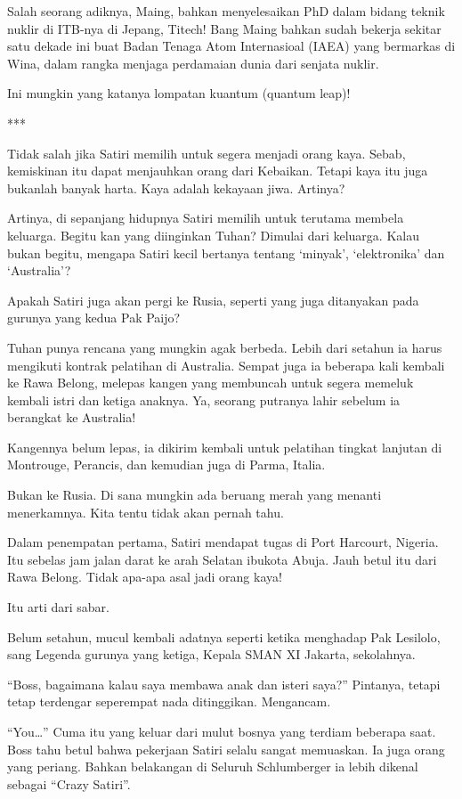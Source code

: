 Salah seorang adiknya, Maing, bahkan menyelesaikan PhD dalam bidang teknik nuklir di ITB-nya di Jepang, Titech! Bang Maing bahkan sudah bekerja sekitar satu dekade ini buat Badan Tenaga Atom Internasioal (IAEA) yang bermarkas di Wina, dalam rangka menjaga perdamaian dunia dari senjata nuklir.

Ini mungkin yang katanya lompatan kuantum (quantum leap)!

***

Tidak salah jika Satiri memilih untuk segera menjadi orang kaya. Sebab, kemiskinan itu dapat menjauhkan orang dari Kebaikan. Tetapi kaya itu juga bukanlah banyak harta. Kaya adalah kekayaan jiwa. Artinya?

Artinya, di sepanjang hidupnya Satiri memilih untuk terutama membela keluarga. Begitu kan yang diinginkan Tuhan? Dimulai dari keluarga. Kalau bukan begitu, mengapa Satiri kecil bertanya tentang ‘minyak’, ‘elektronika’ dan ‘Australia’?

Apakah Satiri juga akan pergi ke Rusia, seperti yang juga ditanyakan pada gurunya yang kedua Pak Paijo?

Tuhan punya rencana yang mungkin agak berbeda. Lebih dari setahun ia harus mengikuti kontrak pelatihan di Australia. Sempat juga ia beberapa kali kembali ke Rawa Belong, melepas kangen yang membuncah untuk segera memeluk kembali istri dan ketiga anaknya. Ya, seorang putranya lahir sebelum ia berangkat ke Australia!

Kangennya belum lepas, ia dikirim kembali untuk pelatihan tingkat lanjutan di Montrouge, Perancis, dan kemudian juga di Parma, Italia.

Bukan ke Rusia. Di sana mungkin ada beruang merah yang menanti menerkamnya. Kita tentu tidak akan pernah tahu.

Dalam penempatan pertama, Satiri mendapat tugas di Port Harcourt, Nigeria. Itu sebelas jam jalan darat ke arah Selatan ibukota Abuja. Jauh betul itu dari Rawa Belong. Tidak apa-apa asal jadi orang kaya!

Itu arti dari sabar.

Belum setahun, mucul kembali adatnya seperti ketika menghadap Pak Lesilolo, sang Legenda gurunya yang ketiga, Kepala SMAN XI Jakarta, sekolahnya.

“Boss, bagaimana kalau saya membawa anak dan isteri saya?” Pintanya, tetapi tetap terdengar seperempat nada ditinggikan. Mengancam.

“You…” Cuma itu yang keluar dari mulut bosnya yang terdiam beberapa saat. Boss tahu betul bahwa pekerjaan Satiri selalu sangat memuaskan. Ia juga orang yang periang. Bahkan belakangan di Seluruh Schlumberger ia lebih dikenal sebagai “Crazy Satiri”.

